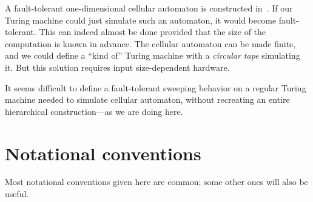 \documentclass[12pt]{memoir}
\begin{document}
A fault-tolerant one-dimensional cellular automaton is constructed
in~\cite{GacsSorg01}.
If our Turing machine could just simulate such an automaton, it would become
fault-tolerant.
This can indeed almost be done provided that the size of the computation is known in advance.
The cellular automaton can be made finite, and we could define
a ``kind of'' Turing machine with a \emph{circular tape} simulating it.
But this solution requires input size-dependent hardware.

It seems difficult to define a fault-tolerant sweeping 
behavior on a regular Turing machine needed to 
simulate cellular automaton, without recreating
an entire hierarchical construction---as we are doing here.


\section{Notational conventions}\label{sec:notational-conventions}

Most notational conventions given here are common; some other ones will
also be useful.
\end{document}
